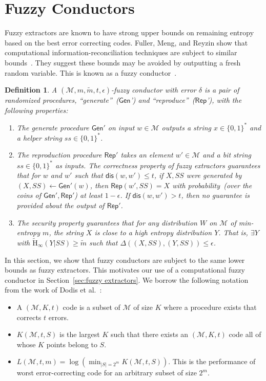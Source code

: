 \documentclass[11pt]{article}
\newcommand{\secref}[1]{\mbox{Section~\ref{#1}}}
\newcommand{\class}[1]{{\ensuremath{\mathsf{#1}}}}
\newcommand{\gen}{\ensuremath{\class{Gen}}\xspace}
\newcommand{\rep}{\ensuremath{\class{Rep}}\xspace}
\newcommand{\zo}{\ensuremath{\{0, 1\}}}
\newcommand{\dis}{\ensuremath{\mathsf{dis}}}
\newcommand{\Hav}{\tilde{\mathrm{H}}_\infty}
\newtheorem{definition}[theorem]{Definition}
\begin{document}
\section{Fuzzy Conductors}

\label{sec:conductors}
Fuzzy extractors are known to have strong upper bounds on remaining entropy based on the best error correcting codes.  Fuller, Meng, and Reyzin show that computational information-reconciliation techniques are subject to similar bounds~\cite{fuller2013computational}.  They suggest these bounds may be avoided by outputting a fresh random variable.  This is known as a fuzzy conductor~\cite{KanukurthiR09}.
\begin{definition}
A $(\mathcal{M}, m, \tilde{m}, t, \epsilon)$-\emph{fuzzy conductor} with error $\delta$ is a pair of randomized procedures, ``generate''~(\gen') and ``reproduce''~(\rep'), with the following properties:
\begin{enumerate}
\item The generate procedure $\gen'$ on input $w\in \mathcal{M}$ outputs a string $x\in\zo^*$ and a helper string $ss\in\zo^*$.
\item The reproduction procedure $\rep'$ takes an element $w'\in\mathcal{M}$ and a bit string $ss\in\zo^*$ as inputs.  The \emph{correctness} property of fuzzy extractors guarantees that for $w$ and $w'$ such that $\dis(w, w')\leq t$, if $X, SS$ were generated by $(X, SS)\leftarrow \gen'(w)$, then $\rep(w', SS) = X$ with probability~(over the coins of $\gen', \rep'$) at least $1-\epsilon$.  If $\dis(w, w')>t$, then no guarantee is provided about the output of $\rep'$.
\item The security property guarantees that for any distribution $W$ on $\mathcal{M}$ of min-entropy $m$, the string $X$ is close to a high entropy distribution $Y$.  That is, $\exists Y$ with $\Hav(Y | SS ) \geq \tilde{m}$ such that $\Delta((X, SS), (Y, SS))\leq \epsilon$.
\end{enumerate}
\end{definition}

\noindent In this section, we show that fuzzy conductors are subject to the same lower bounds as fuzzy extractors.  This motivates our use of a computational fuzzy conductor in \secref{sec:fuzzy extractors}.
We borrow the following notation from the work of Dodis et al.~\cite{DBLP:journals/siamcomp/DodisORS08}:
\begin{itemize}
\item A $(\mathcal{M}, K, t)$ code is a subset of $\mathcal{M}$ of size $K$ where a procedure exists that corrects $t$ errors.
\item $K(\mathcal{M}, t, S)$ is the largest $K$ such that there exists an $(\mathcal{M}, K, t)$ code all of whose $K$ points belong to $S$.
\item $L(\mathcal{M}, t, m) = \log (\min_{|S| = 2^m} K(\mathcal{M}, t, S))$.  This is the performance of worst error-correcting code for an arbitrary subset of size $2^m$.
\end{itemize}
\end{document}
